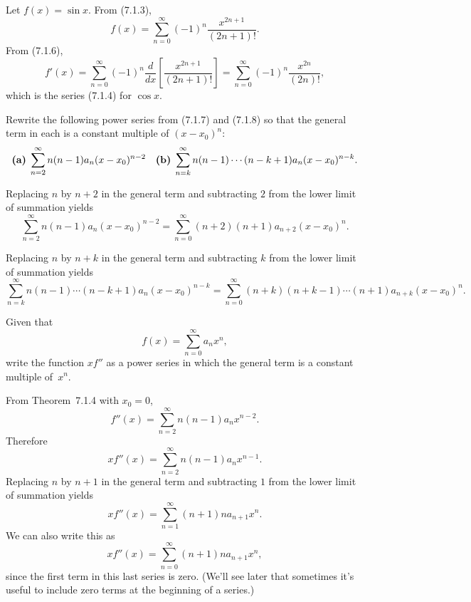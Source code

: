 \setcounter{example}{1}
\begin{example}
  \label{example:7.1.2} \rm Let $f(x)=\sin x$. From \textup{(7.1.3)},
  \[
    f(x)=\sum_{n=0}^{\infty}(-1)^{n}\frac{x^{2n+1}}{(2n+1)!}.
  \]
  From \textup{(7.1.6)},
  \[
    f'(x)=\sum_{n=0}^{\infty}(-1)^{n}\frac{d}{dx}\left[\frac{x^{2n+1}}{(2n+1)!}\right]= \sum_{n=0}^{\infty}(-1)^{n}\frac{x^{2n}}{(2n)!},
  \]
  which is the series \textup{(7.1.4)} for $\cos x$.
\end{example}

\setcounter{example}{2}
\begin{example}
  \label{example:7.1.3} \rm Rewrite the following power series from \textup{(7.1.7)} and
  \textup{(7.1.8)} so that the general term in each is a constant multiple of $(x-x_{0})^{n}$:
  \[
    \mbox{\bf (a)}\; \sum_{n=2}^{\infty}n(n-1)a_{n}(x-x_{0})^{n-2}\quad\mbox{\bf (b)}\; \sum_{n=k}^{\infty}n(n-1)\cdots(n-k+1)a_{n}(x-x_{0})^{n-k}.
  \]
\end{example}
\begin{examplesolution}
 Replacing $n$ by $n+2$ in the general term and subtracting $2$ from the lower limit
of summation yields
\[
  \sum_{n=2}^{\infty}n(n-1)a_{n}(x-x_{0})^{n-2}= \sum_{n=0}^{\infty}(n+2)(n+1)a_{n+2}(x-x_{0})^{n}.
\]

 Replacing $n$ by $n+k$ in the general term and subtracting $k$ from the lower limit
of summation yields
\[
  \sum_{n=k}^{\infty}n(n-1)\cdots(n-k+1)a_{n}(x-x_{0})^{n-k}= \sum_{n=0}^{\infty}(n+k)(n+k-1)\cdots(n+1)a_{n+k}(x-x_{0})^{n}.
\]
\end{examplesolution}

\setcounter{example}{3}
\begin{example}
  \label{example:7.1.4} \rm Given that
  \[
    f(x)=\sum_{n=0}^{\infty}a_{n}x^{n},
  \]
  write the function $xf''$ as a power series in which the general term is a constant multiple
  of~$x^{n}$.
\end{example}
\begin{examplesolution}
\solution From Theorem~7.1.4 with $x_{0}=0$,
\[
  f''(x)=\sum_{n=2}^{\infty}n(n-1)a_{n}x^{n-2}.
\]
Therefore
\[
  xf''(x)=\sum_{n=2}^{\infty}n(n-1)a_{n}x^{n-1}.
\]
Replacing $n$ by $n+1$ in the general term and subtracting $1$ from the lower limit of summation
yields
\[
  xf''(x)=\sum_{n=1}^{\infty}(n+1)na_{n+1}x^{n}.
\]
We can also write this as
\[
  xf''(x)=\sum_{n=0}^{\infty}(n+1)na_{n+1}x^{n},
\]
since the first term in this last series is zero. (We'll see later that sometimes it's useful to
include zero terms at the beginning of a series.)
\end{examplesolution}

